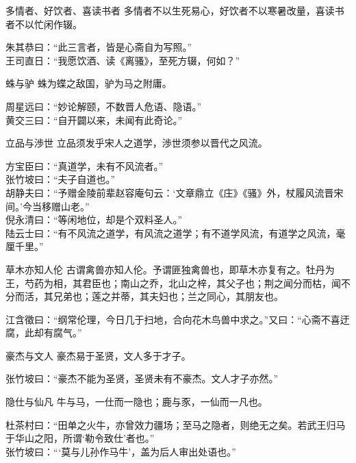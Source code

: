 \begin{yulu}{多情者、好饮者、喜读书者}
多情者不以生死易心，好饮者不以寒暑改量，喜读书者不以忙闲作辍。
\begin{comments}
朱其恭曰：“此三言者，皆是心斋自为写照。” \\
王司直日：“我愿饮酒、读《离骚》，至死方辍，何如？”
\end{comments}
\end{yulu}

\begin{yulu}{蛛与驴}
蛛为蝶之敌国，驴为马之附庸。
\begin{comments}
周星远曰：“妙论解颐，不数晋人危语、隐语。” \\
黄交三曰：“自开闢以来，未闻有此奇论。”
\end{comments}
\end{yulu}

\begin{yulu}{立品与渉世}
立品须发乎宋人之道学，渉世须参以晋代之风流。
\begin{comments}
方宝臣曰：“真道学，未有不风流者。” \\
张竹坡曰：“夫子自道也。” \\
胡静夫曰：“予赠金陵前辈赵容庵句云：‘文章鼎立《庄》《骚》外，杖履风流晋宋间。’今当移赠山老。” \\
倪永清曰：“等闲地位，却是个双料圣人。” \\
陆云士曰：“有不风流之道学，有风流之道学；有不道学风流，有道学之风流，毫厘千里。”
\end{comments}
\end{yulu}

\begin{yulu}{草木亦知人伦}
古谓禽兽亦知人伦。予谓匪独禽兽也，即草木亦复有之。牡丹为王，芍药为相，其君臣也；南山之乔，北山之梓，其父子也；荆之闻分而枯，闻不分而活，其兄弟也；莲之并蒂，其夫妇也；兰之同心，其朋友也。
\begin{comments}
江含徵曰：“纲常伦理，今日几于扫地，合向花木鸟兽中求之。”又曰：“心斋不喜迂腐，此却有腐气。”
\end{comments}
\end{yulu}

\begin{yulu}{豪杰与文人}
豪杰易于圣贤，文人多于才子。
\begin{comments}
张竹坡曰：“豪杰不能为圣贤，圣贤未有不豪杰。文人才子亦然。”
\end{comments}
\end{yulu}

\begin{yulu}{隐仕与仙凡}
牛与马，一仕而一隐也；鹿与豕，一仙而一凡也。
\begin{comments}
杜茶村曰：“田单之火牛，亦曾效力疆场；至马之隐者，则绝无之矣。若武王归马于华山之阳，所谓‘勒令致仕’者也。” \\
张竹坡曰：“‘莫与儿孙作马牛’，盖为后人审出处语也。”
\end{comments}
\end{yulu}

